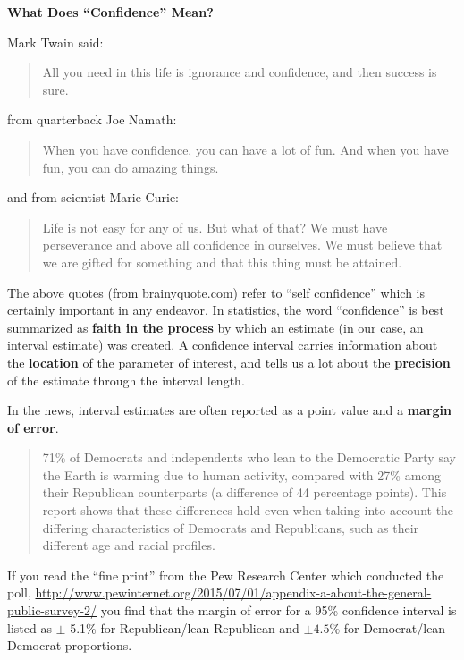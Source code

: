 
\def\theTopic{Confidence }
\def\dayNum{7}

\begin{center}
\vspace*{-.2in}
{\bf {\large What Does ``Confidence'' Mean?}}\\
\end{center}

Mark Twain said:
\begin{quotation}
All you need in this life is ignorance and confidence, and then
success is sure.   
\end{quotation}

 from quarterback Joe Namath:
\begin{quotation}
When you have confidence, you can have a lot of fun. And when you have fun, you can do amazing things.  
\end{quotation}

and from scientist Marie Curie:
\begin{quotation}
  Life is not easy for any of us. But what of that? We must have
  perseverance and above all confidence in ourselves. We must believe
  that we are gifted for something and that this thing must be
  attained. 
\end{quotation}

The above quotes (from brainyquote.com) refer to  ``self confidence''
which is certainly important in any endeavor.
In statistics, the word ``confidence'' is best summarized as {\bf
  faith in the process} by which an estimate (in our case, an interval
estimate) was created.  A confidence interval carries information
about the {\bf location} of the parameter of interest, and tells us a lot
about the {\bf precision} of the estimate through the interval
length. 


In the news, interval estimates are often reported as a point value
and a {\bf margin of error}. 

\begin{quotation}
  71\% of Democrats and independents who lean to the Democratic Party
  say the Earth is warming due to human activity, compared with 27\%
  among their Republican counterparts (a difference of 44 percentage
  points). This report shows that these differences hold even when
  taking into account the differing characteristics of Democrats and
  Republicans, such as their different age and racial profiles. 
\end{quotation}

  If you read the ``fine print'' from the  Pew Research Center which
  conducted the poll,
\url{http://www.pewinternet.org/2015/07/01/appendix-a-about-the-general-public-survey-2/}
you find that the margin of error for a 95\% confidence interval is
listed as $\pm$ 5.1\% for Republican/lean Republican and $\pm 4.5$\%
for Democrat/lean Democrat proportions.\vspace{2cm}

